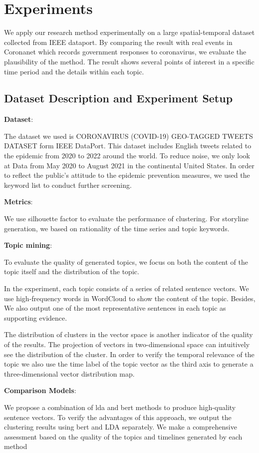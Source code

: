 \section{Experiments}
\label{sec:exp}
We apply our research method experimentally on a large spatial-temporal dataset collected from IEEE dataport. By comparing the result with real events in Coronanet which records government responses to coronavirus, we evaluate the plausibility of the method. The result shows several points of interest in a specific time period and the details within each topic.
\subsection{Dataset Description and Experiment Setup}
{\bf Dataset}: 

The dataset we used is CORONAVIRUS (COVID-19) GEO-TAGGED TWEETS DATASET form IEEE DataPort. This dataset includes English tweets related to the epidemic from 2020 to 2022 around the world. To reduce noise, we only look at Data from May 2020 to August 2021 in the continental United States. In order to reflect the public's attitude to the epidemic prevention measures, we used the keyword list to conduct further screening.

{\bf Metrics}:

We use silhouette factor to evaluate the performance of clustering. For storyline generation, we based on rationality of the time series and topic keywords. 

{\bf Topic mining}:

To evaluate the quality of generated topics, we focus on both the content of the topic itself and the distribution of the topic. 


In the experiment, each topic consists of a series of related sentence vectors. We use high-frequency words in WordCloud to show the content of the topic. Besides, We also output one of the most representative sentences in each topic as supporting evidence. 

The distribution of clusters in the vector space is another indicator of the quality of the results. The projection of vectors in two-dimensional space can intuitively see the distribution of the cluster. In order to verify the temporal relevance of the topic we also use the time label of the topic vector as the third axis to generate a three-dimensional vector distribution map.

{\bf Comparison Models}: 

We propose a combination of lda and bert methods to produce high-quality sentence vectors. To verify the advantages of this approach, we output the clustering results using bert and LDA separately. We make a comprehensive assessment based on the quality of the topics and timelines generated by each method
